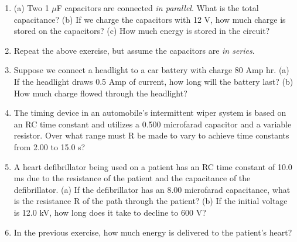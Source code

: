\documentclass{article}
\begin{document}
\begin{enumerate}
\item (a) Two 1 $\mu$F capacitors are connected \textit{in parallel}.  What is the total capacitance? (b) If we charge the capacitors with 12 V, how much charge is stored on the capacitors? (c) How much energy is stored in the circuit? \\ \vspace{3cm}
\item Repeat the above exercise, but assume the capacitors are \textit{in series}. \\ \vspace{2cm}
\item Suppose we connect a headlight to a car battery with charge 80 Amp hr.  (a) If the headlight draws 0.5 Amp of current, how long will the battery last? (b) How much charge flowed through the headlight? \\ \vspace{2cm}
\item The timing device in an automobile's intermittent wiper system is based on an RC time constant and utilizes a 0.500 microfarad capacitor and a variable resistor. Over what range must R be made to vary to achieve time constants from 2.00 to 15.0 s? \\ \vspace{2cm}
\item A heart defibrillator being used on a patient has an RC time constant of 10.0 ms due to the resistance of the patient and the capacitance of the defibrillator. (a) If the defibrillator has an 8.00 microfarad capacitance, what is the resistance R of the path through the patient? (b) If the initial voltage is 12.0 kV, how long does it take to decline to 600 V? \\ \vspace{3cm}
\item In the previous exercise, how much energy is delivered to the patient's heart?
\end{enumerate}
\end{document}
